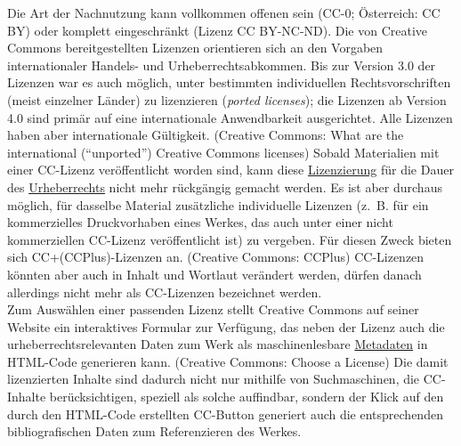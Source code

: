 \documentclass{article}
\begin{document}
        Die Art der Nachnutzung kann vollkommen offenen sein (CC-0; Österreich: CC BY)
                  oder komplett eingeschränkt (Lizenz CC BY-NC-ND). Die von Creative Commons
                  bereitgestellten Lizenzen orientieren sich an den Vorgaben internationaler
                  Handels- und Urheberrechtsabkommen. Bis zur Version 3.0 der Lizenzen war es auch
                  möglich, unter bestimmten individuellen Rechtsvorschriften (meist einzelner
                  Länder) zu lizenzieren (\emph{ported licenses}); die Lizenzen ab
                  Version 4.0 sind primär auf eine internationale Anwendbarkeit ausgerichtet. Alle
                  Lizenzen haben aber internationale Gültigkeit. (Creative Commons: What are
                     the international (“unported”) Creative Commons licenses) Sobald
                  Materialien mit einer CC-Lizenz veröffentlicht worden sind, kann diese \href{http://gams.uni-graz.at/o:konde.119}{Lizenzierung} für die Dauer des \href{http://gams.uni-graz.at/o:konde.44}{Urheberrechts} nicht mehr rückgängig
                  gemacht werden. Es ist aber durchaus möglich, für dasselbe Material zusätzliche
                  individuelle Lizenzen (z. B. für ein kommerzielles Druckvorhaben eines Werkes, das
                  auch unter einer nicht kommerziellen CC-Lizenz veröffentlicht ist) zu vergeben.
                  Für diesen Zweck bieten sich CC+(CCPlus)-Lizenzen an. (Creative Commons: CCPlus) CC-Lizenzen könnten aber auch in Inhalt und Wortlaut verändert
                  werden, dürfen danach allerdings nicht mehr als CC-Lizenzen bezeichnet werden.\\
            
        Zum Auswählen einer passenden Lizenz stellt Creative Commons auf seiner Website
                  ein interaktives Formular zur Verfügung, das neben der Lizenz auch die
                  urheberrechtsrelevanten Daten zum Werk als maschinenlesbare \href{http://gams.uni-graz.at/o:konde.25}{Metadaten} in HTML-Code generieren kann.
                     (Creative Commons: Choose a License) Die damit lizenzierten
                  Inhalte sind dadurch nicht nur mithilfe von Suchmaschinen, die CC-Inhalte
                  berücksichtigen, speziell als solche auffindbar, sondern der Klick auf den durch
                  den HTML-Code erstellten CC-Button generiert auch die entsprechenden
                  bibliografischen Daten zum Referenzieren des Werkes. \\
            
\end{document}

